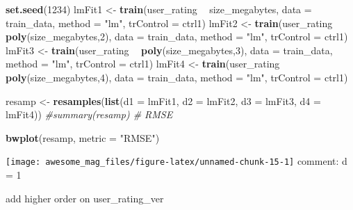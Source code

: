 \documentclass[]{article}
\newenvironment{Shaded}{\begin{snugshade}}{\end{snugshade}}
\newcommand{\KeywordTok}[1]{\textcolor[rgb]{0.13,0.29,0.53}{\textbf{#1}}}
\newcommand{\DataTypeTok}[1]{\textcolor[rgb]{0.13,0.29,0.53}{#1}}
\newcommand{\DecValTok}[1]{\textcolor[rgb]{0.00,0.00,0.81}{#1}}
\newcommand{\StringTok}[1]{\textcolor[rgb]{0.31,0.60,0.02}{#1}}
\newcommand{\CommentTok}[1]{\textcolor[rgb]{0.56,0.35,0.01}{\textit{#1}}}
\newcommand{\OperatorTok}[1]{\textcolor[rgb]{0.81,0.36,0.00}{\textbf{#1}}}
\newcommand{\NormalTok}[1]{#1}
\begin{document}
\begin{Shaded}
\begin{Highlighting}[]
\KeywordTok{set.seed}\NormalTok{(}\DecValTok{1234}\NormalTok{)}
\NormalTok{lmFit1 <-}\StringTok{ }\KeywordTok{train}\NormalTok{(user_rating }\OperatorTok{~}\StringTok{ }\NormalTok{size_megabytes,}
                \DataTypeTok{data =}\NormalTok{ train_data, }
                \DataTypeTok{method =} \StringTok{"lm"}\NormalTok{,}
                \DataTypeTok{trControl =}\NormalTok{ ctrl1) }
\NormalTok{lmFit2 <-}\StringTok{ }\KeywordTok{train}\NormalTok{(user_rating }\OperatorTok{~}\StringTok{ }\KeywordTok{poly}\NormalTok{(size_megabytes,}\DecValTok{2}\NormalTok{),}
                \DataTypeTok{data =}\NormalTok{ train_data, }
                \DataTypeTok{method =} \StringTok{"lm"}\NormalTok{,}
                \DataTypeTok{trControl =}\NormalTok{ ctrl1)}
\NormalTok{lmFit3 <-}\StringTok{ }\KeywordTok{train}\NormalTok{(user_rating }\OperatorTok{~}\StringTok{ }\KeywordTok{poly}\NormalTok{(size_megabytes,}\DecValTok{3}\NormalTok{),}
                \DataTypeTok{data =}\NormalTok{ train_data, }
                \DataTypeTok{method =} \StringTok{"lm"}\NormalTok{,}
                \DataTypeTok{trControl =}\NormalTok{ ctrl1)}
\NormalTok{lmFit4 <-}\StringTok{ }\KeywordTok{train}\NormalTok{(user_rating }\OperatorTok{~}\StringTok{ }\KeywordTok{poly}\NormalTok{(size_megabytes,}\DecValTok{4}\NormalTok{),}
                \DataTypeTok{data =}\NormalTok{ train_data, }
                \DataTypeTok{method =} \StringTok{"lm"}\NormalTok{,}
                \DataTypeTok{trControl =}\NormalTok{ ctrl1)}

\NormalTok{resamp <-}\StringTok{ }\KeywordTok{resamples}\NormalTok{(}\KeywordTok{list}\NormalTok{(}\DataTypeTok{d1 =}\NormalTok{ lmFit1, }\DataTypeTok{d2 =}\NormalTok{ lmFit2, }\DataTypeTok{d3 =}\NormalTok{ lmFit3, }\DataTypeTok{d4 =}\NormalTok{ lmFit4)) }
\CommentTok{#summary(resamp) # RMSE}

\KeywordTok{bwplot}\NormalTok{(resamp, }\DataTypeTok{metric =} \StringTok{"RMSE"}\NormalTok{)}
\end{Highlighting}
\end{Shaded}

\texttt{[image: awesome\_mag\_files/figure-latex/unnamed-chunk-15-1]}
comment: d = 1

add higher order on user\_rating\_ver
\end{document}
